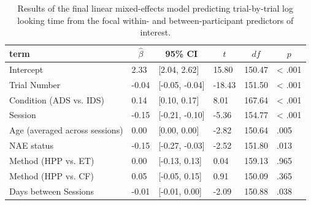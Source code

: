 \documentclass[
  man, donotrepeattitle,floatsintext]{apa6}
\begin{document}
\begin{table}[tbp]

\begin{center}
\begin{threeparttable}

\caption{\label{tab:unnamed-chunk-44}Results of the final linear mixed-effects model predicting trial-by-trial log looking time from the focal within- and between-participant predictors of interest.}

\begin{tabular}{llllll}
\toprule
term & \multicolumn{1}{c}{$\hat{\beta}$} & \multicolumn{1}{c}{95\% CI} & \multicolumn{1}{c}{$t$} & \multicolumn{1}{c}{$\mathit{df}$} & \multicolumn{1}{c}{$p$}\\
\midrule
Intercept & 2.33 & {}[2.04, 2.62] & 15.80 & 150.47 & < .001\\
Trial Number & -0.04 & {}[-0.05, -0.04] & -18.43 & 151.50 & < .001\\
Condition (ADS vs. IDS) & 0.14 & {}[0.10, 0.17] & 8.01 & 167.64 & < .001\\
Session & -0.15 & {}[-0.21, -0.10] & -5.36 & 154.77 & < .001\\
Age (averaged across sessions) & 0.00 & {}[0.00, 0.00] & -2.82 & 150.64 & .005\\
NAE status & -0.15 & {}[-0.27, -0.03] & -2.52 & 151.80 & .013\\
Method (HPP vs. ET) & 0.00 & {}[-0.13, 0.13] & 0.04 & 159.13 & .965\\
Method (HPP vs. CF) & 0.05 & {}[-0.05, 0.15] & 0.91 & 150.09 & .365\\
Days between Sessions & -0.01 & {}[-0.01, 0.00] & -2.09 & 150.88 & .038\\
\bottomrule
\end{tabular}

\end{threeparttable}
\end{center}

\end{table}
\end{document}
